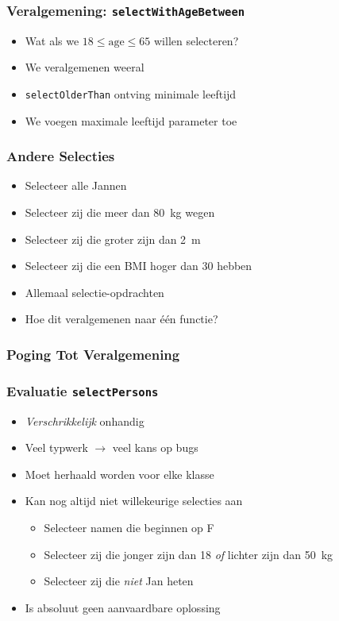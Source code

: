\begin{frame}
  \frametitle{Veralgemening: \texttt{selectWithAgeBetween}}
  \begin{itemize}
    \item Wat als we $18 \leq \mathrm{age} \leq 65$ willen selecteren?
    \item We veralgemenen weeral
    \item \texttt{selectOlderThan} ontving minimale leeftijd
    \item We voegen maximale leeftijd parameter toe
  \end{itemize}
  \vskip5mm
\end{frame}

\begin{frame}
  \frametitle{Andere Selecties}
  \begin{itemize}
    \item Selecteer alle Jannen
    \item Selecteer zij die meer dan \SI{80}{\kilogram} wegen
    \item Selecteer zij die groter zijn dan \SI{2}{\meter}
    \item Selecteer zij die een BMI hoger dan 30 hebben
  \end{itemize}
  \vskip5mm
  \begin{itemize}
    \item Allemaal selectie-opdrachten
    \item Hoe dit veralgemenen naar \'e\'en functie?
  \end{itemize}
\end{frame}

\begin{frame}
  \frametitle{Poging Tot Veralgemening}
\end{frame}

\begin{frame}
  \frametitle{Evaluatie \texttt{selectPersons}}
  \begin{itemize}
    \item \emph{Verschrikkelijk} onhandig
    \item Veel typwerk $\rightarrow$ veel kans op bugs
    \item Moet herhaald worden voor elke klasse
    \item Kan nog altijd niet willekeurige selecties aan
          \begin{itemize}
            \item Selecteer namen die beginnen op F
            \item Selecteer zij die jonger zijn dan 18 \emph{of} lichter zijn dan \SI{50}{\kilogram}
            \item Selecteer zij die \emph{niet} Jan heten
          \end{itemize}
    \item Is absoluut geen aanvaardbare oplossing
  \end{itemize}
\end{frame}

